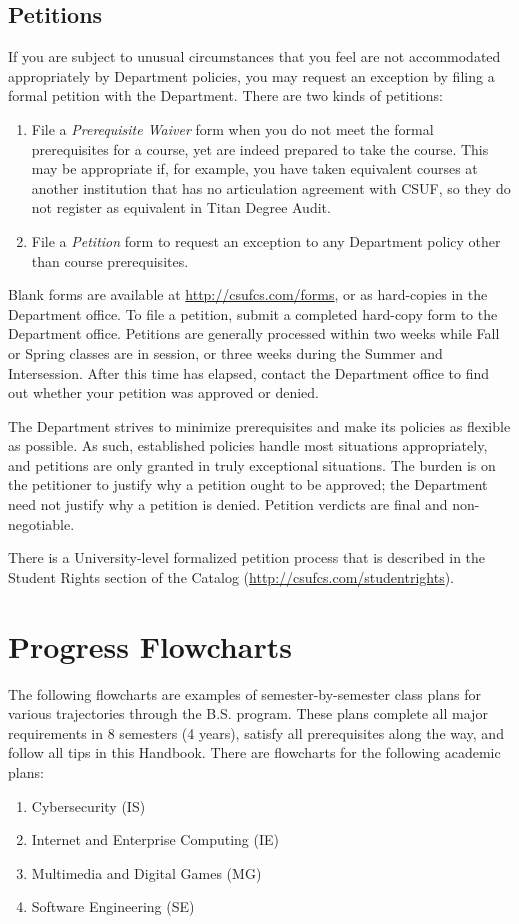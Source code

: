 \documentclass{book}
\newcommand{\CampusName}{CSUF}
\newcommand{\IeTrackName}{Internet and Enterprise Computing (IE)}
\newcommand{\IsTrackName}{Cybersecurity (IS)}
\newcommand{\MgTrackName}{Multimedia and Digital Games (MG)}
\newcommand{\SeTrackName}{Software Engineering (SE)}
\newcommand{\shrunkurl}[1]{\url{http://csufcs.com/#1}}
\begin{document}
\section{Petitions}
\label{section:petitions}


If you are subject to unusual circumstances that you feel are not accommodated appropriately by Department policies, you may request an exception by filing a formal petition with the Department. There are two kinds of petitions:
\begin{enumerate}
\item File a \emph{Prerequisite Waiver} form when you do not meet the formal prerequisites for a course, yet are indeed prepared to take the course. This may be appropriate if, for example, you have taken equivalent courses at another institution that has no articulation agreement with \CampusName, so they do not register as equivalent in Titan Degree Audit.
\item File a \emph{Petition} form to request an exception to any Department policy other than course prerequisites.
\end{enumerate}

Blank forms are available at \shrunkurl{forms}, or as hard-copies in the Department office. To file a petition, submit a completed hard-copy form to the Department office. Petitions are generally processed within two weeks while Fall or Spring classes are in session, or three weeks during the Summer and Intersession. After this time has elapsed, contact the Department office to find out whether your petition was approved or denied.

The Department strives to minimize prerequisites and make its policies as flexible as possible. As such, established policies handle most situations appropriately, and petitions are only granted in truly exceptional situations. The burden is on the petitioner to justify why a petition ought to be approved; the Department need not justify why a petition is denied. Petition verdicts are final and non-negotiable.

There is a University-level formalized petition process that is described in the Student Rights section of the Catalog (\shrunkurl{studentrights}).

\chapter{Progress Flowcharts}

The following flowcharts are examples of semester-by-semester class plans for various trajectories through the B.S. program. These plans complete all major requirements in 8 semesters (4 years), satisfy all prerequisites along the way, and follow all tips in this Handbook. There are flowcharts for the following academic plans:
\begin{enumerate}
\item \IsTrackName
\item \IeTrackName
\item \MgTrackName
\item \SeTrackName
\end{enumerate}
\end{document}
